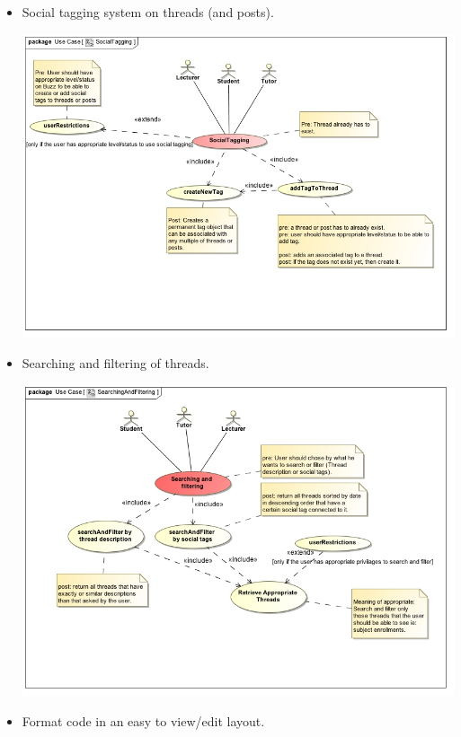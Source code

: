 \documentclass[a4paper,12pt]{report}
\begin{document}
\begin{itemize}
\begin{center}
	\end{center}
  \item Social tagging system on threads (and posts).
	\begin{center}
  	\includegraphics[width=1\textwidth]{../Functional_Requirements_DIagrams/UseCases/UseCase_SocialTagging.jpg}\\[0.4cm]    
	\end{center}
  \item Searching and filtering of threads.
	\begin{center}
  	\includegraphics[width=1\textwidth]{../Functional_Requirements_DIagrams/UseCases/UseCase_SearchingAndFiltering.jpg}\\[0.4cm]    
	\end{center}
  \item Format code in an easy to view/edit layout.

\end{itemize}
\end{document}
